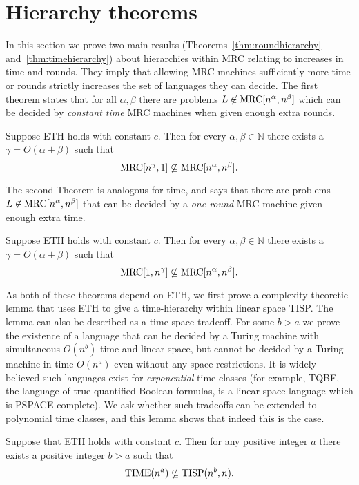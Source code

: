 \documentclass[letterpaper,USenglish]{lipics}
\theoremstyle{definition}
\theoremstyle{remark}
\newcommand{\mrc}{\textup{MRC}}
\newcommand{\TIME}{\textup{TIME}}
\newcommand{\TISP}{\textup{TISP}}
\begin{document}
\section{Hierarchy theorems}\label{sec:hierarchy}

In this section we prove two main results
(Theorems~\ref{thm:roundhierarchy} and~\ref{thm:timehierarchy}) about
hierarchies within MRC relating to increases in time and rounds.
They imply that allowing MRC machines sufficiently more time or rounds
strictly increases the set of languages they can decide.
The first
theorem states that for all $\alpha, \beta$ there are problems $L \not \in
\mrc[n^\alpha, n^\beta]$ which can be decided by \emph{constant time} MRC
machines when given enough extra rounds.

\begin{theorem} \label{thm:roundhierarchy}
Suppose ETH holds with constant $c$. Then for every $\alpha,\beta\in\mathbb N$
there exists a $\gamma = O(\alpha + \beta)$ such that $$\mrc[n^\gamma,1]
\not\subseteq \mrc[n^\alpha, n^\beta].$$
\end{theorem}

The second Theorem is analogous for time, and says that there are problems $L
\not \in \mrc[n^\alpha, n^\beta]$ that can be decided by a \emph{one round} MRC
machine given enough extra time.

\begin{theorem} \label{thm:timehierarchy}
Suppose ETH holds with constant $c$. Then for every $\alpha,\beta\in\mathbb N$
there exists a $\gamma = O(\alpha + \beta)$ such that $$\mrc[1, n^\gamma]
\not\subseteq \mrc[n^\alpha, n^\beta].$$
\end{theorem}

As both of these theorems depend on ETH, we first prove a complexity-theoretic
lemma that uses ETH to give a time-hierarchy within linear space TISP. The
lemma can also be described as a time-space tradeoff. For some $b > a$ we prove
the existence of a language that can be decided by a Turing machine with
simultaneous $O(n^b)$ time and linear space, but cannot be decided by a Turing
machine in time $O(n^a)$ even without any space restrictions. It is widely
believed such languages exist for \emph{exponential} time classes (for example,
TQBF, the language of true quantified Boolean formulas, is a linear space
language which is PSPACE-complete). We ask whether such tradeoffs can be
extended to polynomial time classes, and this lemma shows that indeed this is
the case.

\begin{lemma}\label{lemma:eth} Suppose that ETH holds with constant $c$. Then
for any positive integer $a$ there exists a positive integer $b>a$ such that
$$\TIME(n^a) \nsubseteq \TISP(n^b, n).$$ \end{lemma}
\end{document}
